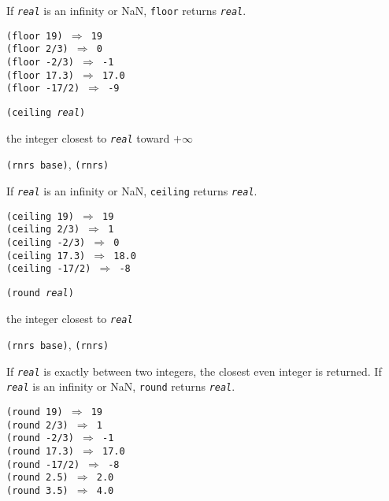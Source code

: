 If \texttt{\textit{real}} is an infinity or NaN, \texttt{floor} returns \texttt{\textit{real}}.


\begin{alltt}
(floor 19) \(\Rightarrow\) 19
(floor 2/3) \(\Rightarrow\) 0
(floor -2/3) \(\Rightarrow\) -1
(floor 17.3) \(\Rightarrow\) 17.0
(floor -17/2) \(\Rightarrow\) -9
\end{alltt}

\begin{description}

\label{objects_s103}\item[procedure] \texttt{(ceiling \textit{real})}



\item[returns] the integer closest to \texttt{\textit{real}} toward \(+\infty\)


\item[libraries] \texttt{(rnrs base)}, \texttt{(rnrs)}
\end{description}


If \texttt{\textit{real}} is an infinity or NaN, \texttt{ceiling} returns \texttt{\textit{real}}.


\begin{alltt}
(ceiling 19) \(\Rightarrow\) 19
(ceiling 2/3) \(\Rightarrow\) 1
(ceiling -2/3) \(\Rightarrow\) 0
(ceiling 17.3) \(\Rightarrow\) 18.0
(ceiling -17/2) \(\Rightarrow\) -8
\end{alltt}

\begin{description}

\label{objects_s104}\item[procedure] \texttt{(round \textit{real})}



\item[returns] the integer closest to \texttt{\textit{real}}


\item[libraries] \texttt{(rnrs base)}, \texttt{(rnrs)}
\end{description}


If \texttt{\textit{real}} is exactly between two integers, the closest even integer
is returned.
If \texttt{\textit{real}} is an infinity or NaN, \texttt{round} returns \texttt{\textit{real}}.


\begin{alltt}
(round 19) \(\Rightarrow\) 19
(round 2/3) \(\Rightarrow\) 1
(round -2/3) \(\Rightarrow\) -1
(round 17.3) \(\Rightarrow\) 17.0
(round -17/2) \(\Rightarrow\) -8
(round 2.5) \(\Rightarrow\) 2.0
(round 3.5) \(\Rightarrow\) 4.0
\end{alltt}

